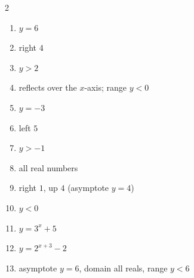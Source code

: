 \documentclass[11pt]{article}
\begin{document}
\begin{keybox}
\begin{multicols}{2}
\small
\begin{enumerate}[leftmargin=*,itemsep=3pt]
  \item $y=6$
  \item right $4$
  \item $y>2$
  \item reflects over the $x$-axis; range $y<0$
  \item $y=-3$
  \item left $5$
  \item $y>-1$
  \item all real numbers
  \item right $1$, up $4$ (asymptote $y=4$)
  \item $y<0$
  \item $y=3^{x}+5$
  \item $y=2^{x+3}-2$
  \item asymptote $y=6$, domain all reals, range $y<6$
\end{enumerate}
\end{multicols}
\end{keybox}
\end{document}

